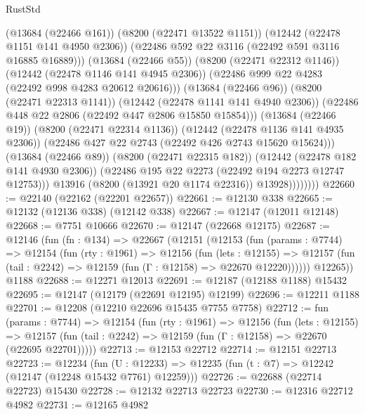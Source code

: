 \begin{lexlean}{RustStd}
\begin{coremodule}
                              (@13684 (@22466 @161))
                              (@8200 (@22471 @13522 @1151))
                              (@12442 (@22478 @1151 @141 @4950 @2306))
                              (@22486 @592 @22 @3116 (@22492 @591 @3116 @16885 @16889)))
                            (@13684 (@22466 @55))
                            (@8200 (@22471 @22312 @1146))
                            (@12442 (@22478 @1146 @141 @4945 @2306))
                            (@22486 @999 @22 @4283 (@22492 @998 @4283 @20612 @20616)))
                          (@13684 (@22466 @96))
                          (@8200 (@22471 @22313 @1141))
                          (@12442 (@22478 @1141 @141 @4940 @2306))
                          (@22486 @448 @22 @2806 (@22492 @447 @2806 @15850 @15854)))
                        (@13684 (@22466 @19))
                        (@8200 (@22471 @22314 @1136))
                        (@12442 (@22478 @1136 @141 @4935 @2306))
                        (@22486 @427 @22 @2743 (@22492 @426 @2743 @15620 @15624)))
                      (@13684 (@22466 @89))
                      (@8200 (@22471 @22315 @182))
                      (@12442 (@22478 @182 @141 @4930 @2306))
                      (@22486 @195 @22 @2273 (@22492 @194 @2273 @12747 @12753)))
                    @13916
                    (@8200 (@13921 @20 @1174 @22316))
                    @13928))))))))
@22660 := @22140 (@22162 (@22201 @22657))
@22661 := @12130 @338
@22665 := @12132 (@12136 @338) (@12142 @338)
@22667 := @12147 (@12011 @12148)
@22668 := @7751 @10666
@22670 := @12147 (@22668 @12175)
@22687 := @12146
    (fun (fn : @134) =>
    @22667
      (@12151
        (@12153
          (fun (params : @7744) =>
          @12154
            (fun (rty : @1961) =>
            @12156
              (fun (lets : @12155) =>
              @12157 (fun (tail : @2242) => @12159 (fun (Γ : @12158) => @22670 @12220))))))
        @12265))
    @1188
@22688 := @12271 @12013
@22691 := @12187 (@12188 @1188) @15432
@22695 := @12147 (@12179 (@22691 @12195) @12199)
@22696 := @12211 @1188
@22701 := @12208 (@12210 @22696 @15435 @7755 @7758)
@22712 := fun (params : @7744) =>
  @12154
    (fun (rty : @1961) =>
    @12156
      (fun (lets : @12155) =>
      @12157 (fun (tail : @2242) => @12159 (fun (Γ : @12158) => @22670 (@22695 @22701)))))
@22713 := @12153 @22712
@22714 := @12151 @22713
@22723 := @12234
    (fun (U : @12233) => @12235 (fun (t : @7) => @12242 (@12147 (@12248 @15432 @7761) @12259)))
@22726 := @22688 (@22714 @22723) @15430
@22728 := @12132 @22713 @22723
@22730 := @12316 @22712 @4982
@22731 := @12165 @4982

\end{coremodule}
\end{lexlean}
